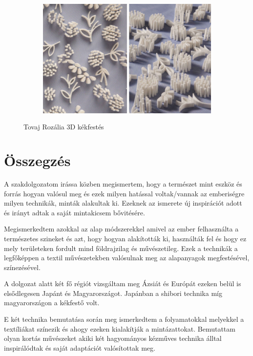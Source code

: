 \documentclass[fontsize=12pt, appendixprefix=true]{scrreprt}
\begin{document}
\begin{figure}[hb!]
\begin{subfigure}[b]{0.3\linewidth}
	  \caption{}
	\end{subfigure}
	\begin{subfigure}[b]{0.3\linewidth}
		\includegraphics[width=\linewidth]{img/tr_03.png}
		\caption{}
	  \end{subfigure}
	\caption{Tovaj Rozália 3D kékfestés}
	\label{fig:tr}
  \end{figure}

\chapter{Összegzés} 
A szakdolgozatom irássa közben megismertem, hogy a természet mint eszköz és forrás hogyan valósul meg és ezek milyen hatással voltak/vannak az emberiségre milyen technikák, minták alakultak ki.
Ezeknek az ismerete új inspirációt adott és irányt adtak a saját mintakicsem bővitésére.

Megismerkedtem azokkal az alap módszerekkel amivel az ember felhasználta a természetes szineket és azt, hogy hogyan alakították ki, használták fel és hogy ez mely területeken fordult mind földrajzilag és művészetileg.
Ezek a technikák a legfőképpen a textil művészetekben valósulnak meg az alapanyagok megfestésével, színezésével.

A dolgozat alatt két fő régiót vizsgáltam meg Ázsiát és Európát ezeken belül is elsődlegesen Japánt és Magyarországot. Japánban a shibori technika míg magyarországon  a kékfestő volt.

E két technika bemutatása során meg ismerkedtem a folyamatokkal melyekkel a textíliákat színezik és ahogy ezeken kialakítják a mintázattokat.
Bemutattam olyan kortás művészeket akiki  két hagyományos kézműves technika álltal inspirálódtak és saját adaptációt valósítottak meg.






\end{document}
